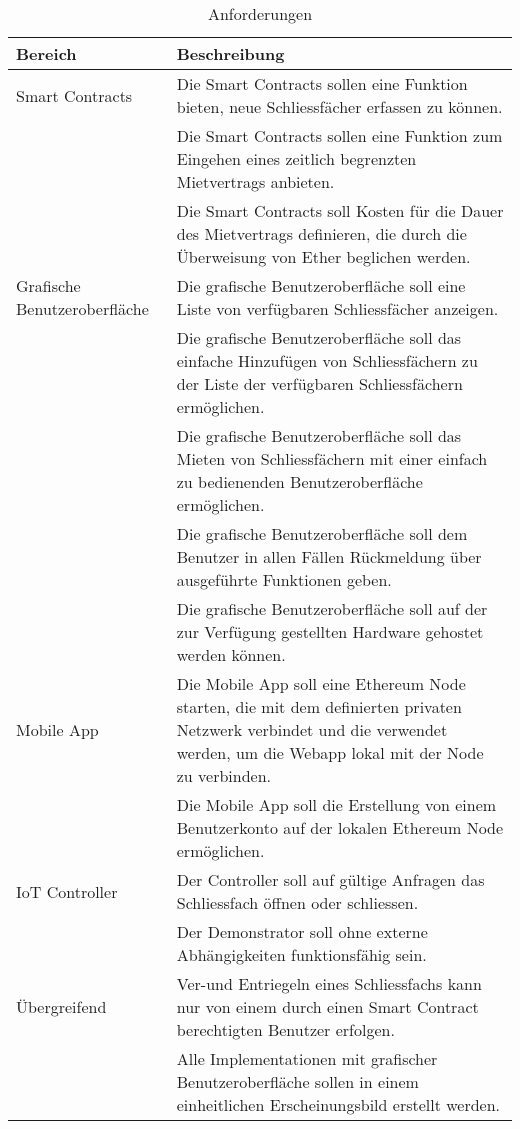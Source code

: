 \begin{table}[H]
\centering
\caption{Anforderungen}
\label{tbl:Anforderungen}
\begin{tabular}{@{}L{3cm}L{10cm}@{}}
\toprule
\textbf{Bereich} & \textbf{Beschreibung} \\ \midrule
Smart Contracts & Die Smart Contracts sollen eine Funktion bieten, neue Schliessfächer erfassen zu
können. \\ \midrule
 & Die Smart Contracts sollen eine Funktion zum Eingehen eines zeitlich begrenzten
Mietvertrags anbieten. \\ \midrule
 & Die Smart Contracts soll Kosten für die Dauer des Mietvertrags definieren, die durch die Überweisung von Ether beglichen werden.\\ \midrule
Grafische Benutzeroberfläche & Die grafische Benutzeroberfläche soll eine Liste von verfügbaren Schliessfächer anzeigen. \\ \midrule
 & Die grafische Benutzeroberfläche soll das einfache Hinzufügen von Schliessfächern zu der Liste der verfügbaren Schliessfächern ermöglichen. \\ \midrule
 & Die grafische Benutzeroberfläche soll das Mieten von Schliessfächern mit einer einfach zu bedienenden Benutzeroberfläche ermöglichen. \\ \midrule
 & Die grafische Benutzeroberfläche soll dem Benutzer in allen Fällen Rückmeldung über ausgeführte Funktionen geben. \\ \midrule
 & Die grafische Benutzeroberfläche soll auf der zur Verfügung gestellten Hardware gehostet werden können. \\ \midrule
Mobile App & Die Mobile App soll eine Ethereum Node starten, die mit dem definierten privaten Netzwerk verbindet und die verwendet werden, um die Webapp lokal mit der Node zu verbinden. \\ \midrule
 & Die Mobile App soll die Erstellung von einem Benutzerkonto auf der lokalen Ethereum Node ermöglichen. \\ \midrule
IoT Controller & Der Controller soll auf gültige Anfragen das Schliessfach öffnen oder schliessen. \\ \midrule
 & Der Demonstrator soll ohne externe Abhängigkeiten funktionsfähig sein. \\ \midrule
Übergreifend & Ver-und Entriegeln eines Schliessfachs kann nur von einem durch einen Smart Contract berechtigten Benutzer erfolgen. \\
 & Alle Implementationen mit grafischer Benutzeroberfläche sollen in einem einheitlichen Erscheinungsbild erstellt werden. \\ \bottomrule
\end{tabular}
\end{table}


